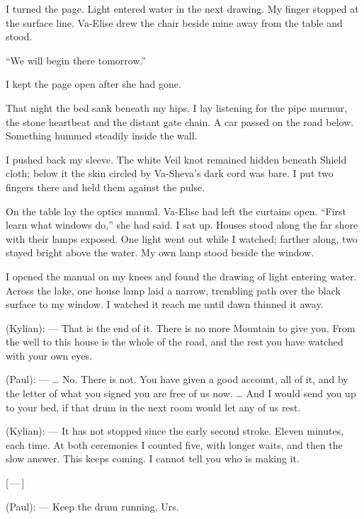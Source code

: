 I turned the page. Light entered water in the next drawing. My finger stopped at the surface line. Va-Elise drew the chair beside mine away from the table and stood.\par

``We will begin there tomorrow.''\par

I kept the page open after she had gone.\par

\ornament

That night the bed sank beneath my hips. I lay listening for the pipe murmur, the stone heartbeat and the distant gate chain. A car passed on the road below. Something hummed steadily inside the wall.\par

I pushed back my sleeve. The white Veil knot remained hidden beneath Shield cloth; below it the skin circled by Va-Sheva's dark cord was bare. I put two fingers there and held them against the pulse.\par

On the table lay the optics manual. Va-Elise had left the curtains open. ``First learn what windows do,'' she had said. I sat up. Houses stood along the far shore with their lamps exposed. One light went out while I watched; farther along, two stayed bright above the water. My own lamp stood beside the window.\par

I opened the manual on my knees and found the drawing of light entering water. Across the lake, one house lamp laid a narrow, trembling path over the black surface to my window. I watched it reach me until dawn thinned it away.\par

\ornament

\begin{room}

(Kylian): --- That is the end of it. There is no more Mountain to give you. From the well to this house is the whole of the road, and the rest you have watched with your own eyes.

(Paul): --- \ldots{} No. There is not. You have given a good account, all of it, and by the letter of what you signed you are free of us now. \ldots{} And I would send you up to your bed, if that drum in the next room would let any of us rest.

(Kylian): --- It has not stopped since the early second stroke. Eleven minutes, each time. At both ceremonies I counted five, with longer waits, and then the slow answer. This keeps coming. I cannot tell you who is making it.

\centerline{[\,---\,]}

(Paul): --- Keep the drum running, Urs.

\end{room}

\ornament
